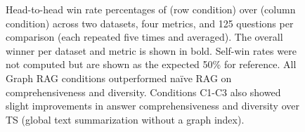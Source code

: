 \documentclass{article}
\begin{document}
\begin{figure}
\begin{minipage}{0.25\textwidth}
\end{minipage}%
\caption{Head-to-head win rate percentages of (row condition) over (column condition) across two datasets, four metrics, and 125 questions per comparison (each repeated five times and averaged). The overall winner per dataset and metric is shown in bold. Self-win rates were not computed but are shown as the expected 50\% for reference. All Graph RAG conditions outperformed na\"ive RAG on comprehensiveness and diversity. Conditions C1-C3 also showed slight improvements in answer comprehensiveness and diversity over TS (global text summarization without a graph index).}
\label{fig:relativemeasures}
\end{figure}



\end{document}
